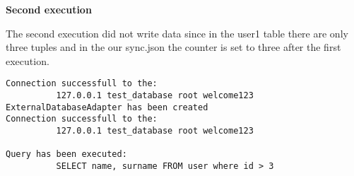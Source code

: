 \textbf{Second execution}

The second execution did not write data since in the user1 table there are only three tuples and in the our sync.json the counter is set to three after the first execution.

\begin{lstlisting}
Connection successfull to the: 
          127.0.0.1 test_database root welcome123 
ExternalDatabaseAdapter has been created
Connection successfull to the: 
          127.0.0.1 test_database root welcome123 

Query has been executed: 
          SELECT name, surname FROM user where id > 3
\end{lstlisting}
